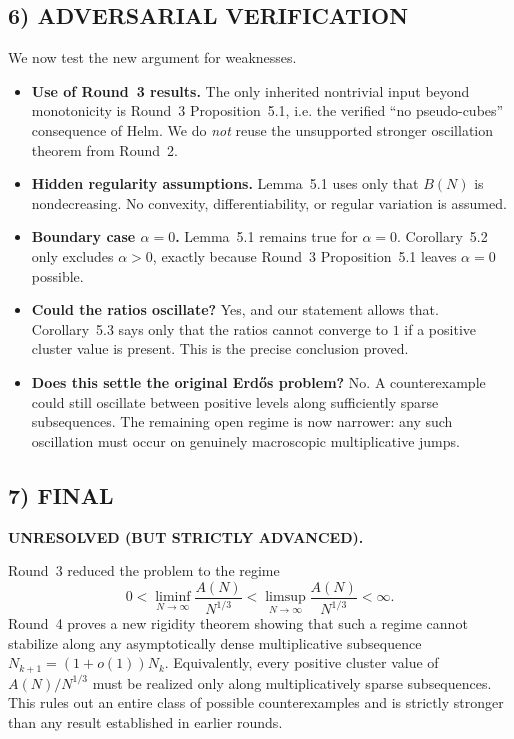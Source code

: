 \subsection{6) ADVERSARIAL VERIFICATION}
We now test the new argument for weaknesses.
\begin{itemize}
  \item \textbf{Use of Round~3 results.} The only inherited nontrivial input beyond monotonicity is Round~3 Proposition~5.1, i.e. the verified ``no pseudo-cubes'' consequence of Helm. We do \emph{not} reuse the unsupported stronger oscillation theorem from Round~2.
  \item \textbf{Hidden regularity assumptions.} Lemma~5.1 uses only that $B(N)$ is nondecreasing. No convexity, differentiability, or regular variation is assumed.
  \item \textbf{Boundary case $\alpha=0$.} Lemma~5.1 remains true for $\alpha=0$. Corollary~5.2 only excludes $\alpha>0$, exactly because Round~3 Proposition~5.1 leaves $\alpha=0$ possible.
  \item \textbf{Could the ratios oscillate?} Yes, and our statement allows that. Corollary~5.3 says only that the ratios cannot converge to $1$ if a positive cluster value is present. This is the precise conclusion proved.
  \item \textbf{Does this settle the original Erd\H{o}s problem?} No. A counterexample could still oscillate between positive levels along sufficiently sparse subsequences. The remaining open regime is now narrower: any such oscillation must occur on genuinely macroscopic multiplicative jumps.
\end{itemize}

\subsection{7) FINAL}
\textbf{UNRESOLVED (BUT STRICTLY ADVANCED).}

Round~3 reduced the problem to the regime
\[
0<\liminf_{N\to\infty}\frac{A(N)}{N^{1/3}}
<
\limsup_{N\to\infty}\frac{A(N)}{N^{1/3}}
<\infty.
\]
Round~4 proves a new rigidity theorem showing that such a regime cannot stabilize along any asymptotically dense multiplicative subsequence $N_{k+1}=(1+o(1))N_k$. Equivalently, every positive cluster value of $A(N)/N^{1/3}$ must be realized only along multiplicatively sparse subsequences. This rules out an entire class of possible counterexamples and is strictly stronger than any result established in earlier rounds.

